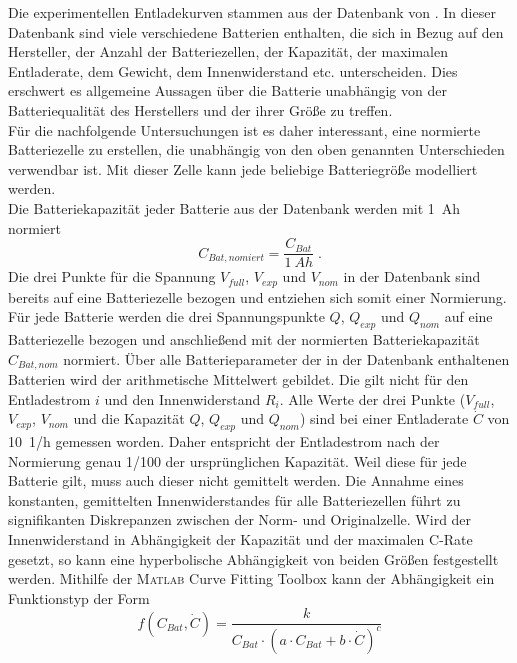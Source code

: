 Die experimentellen Entladekurven stammen aus der Datenbank von \cite{elektromodellflug}. In dieser Datenbank sind viele verschiedene Batterien enthalten, die sich in Bezug auf den Hersteller, der Anzahl der Batteriezellen, der Kapazität, der maximalen Entladerate, dem Gewicht, dem Innenwiderstand etc. unterscheiden. Dies erschwert es allgemeine Aussagen über die Batterie unabhängig von der Batteriequalität des Herstellers und der ihrer Größe zu treffen. \\
Für die nachfolgende Untersuchungen ist es daher interessant, eine normierte Batteriezelle zu erstellen, die unabhängig von den oben genannten Unterschieden verwendbar ist. Mit dieser Zelle kann jede beliebige Batteriegröße modelliert werden. \\
Die Batteriekapazität jeder Batterie aus der Datenbank werden mit \SI{1}{Ah} normiert
\begin{equation}
	C_{Bat,nomiert} = \frac{C_{Bat}}{\SI{1}{Ah}}\; .
\end{equation} 
Die drei Punkte für die Spannung \ensuremath{V_{full}}, \ensuremath{V_{exp}} und \ensuremath{V_{nom}} in der Datenbank sind bereits auf eine Batteriezelle bezogen und entziehen sich somit einer Normierung. 
Für jede Batterie werden die drei Spannungspunkte \ensuremath{Q}, \ensuremath{Q_{exp}} und \ensuremath{Q_{nom}} auf eine Batteriezelle bezogen und anschließend mit der normierten Batteriekapazität \ensuremath{C_{Bat,nom}} normiert. 
Über alle Batterieparameter der in der Datenbank enthaltenen Batterien wird der arithmetische Mittelwert gebildet. 
Die gilt nicht für den Entladestrom \ensuremath{i} und den Innenwiderstand \ensuremath{R_{i}}. Alle Werte der drei Punkte (\ensuremath{V_{full}}, \ensuremath{V_{exp}}, \ensuremath{V_{nom}} und die Kapazität \ensuremath{Q}, \ensuremath{Q_{exp}} und \ensuremath{Q_{nom}}) sind bei einer Entladerate \ensuremath{\dot{C}} von \SI{10}{1/h} gemessen worden. Daher entspricht der Entladestrom nach der Normierung genau 1/100 der ursprünglichen Kapazität.
Weil diese für jede Batterie gilt, muss auch dieser nicht gemittelt werden. 
Die Annahme eines konstanten, gemittelten Innenwiderstandes für alle Batteriezellen führt zu signifikanten Diskrepanzen zwischen der Norm- und Originalzelle. 
Wird der Innenwiderstand in Abhängigkeit der Kapazität und der maximalen C-Rate gesetzt, so kann eine hyperbolische Abhängigkeit von beiden Größen festgestellt werden. 
Mithilfe der \textsc{Matlab} Curve Fitting Toolbox kann der Abhängigkeit ein Funktionstyp der Form
\begin{equation}
	f(C_{Bat},\dot{C}) = \frac{k}{C_{Bat}\cdot(a\cdot C_{Bat}+b\cdot \dot{C})^c}
\end{equation}
